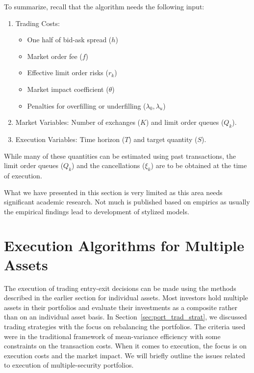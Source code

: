To summarize, recall that the algorithm needs the following input:
	\begin{enumerate}[--]
	\item Trading Costs: 
		\begin{itemize}
		\item One half of bid-ask spread ($h$)
		\item Market order fee ($f$)
		\item Effective limit order risks ($r_k$)
		\item Market impact coefficient ($\theta$)
		\item Penalties for overfilling or underfilling ($\lambda_0,\lambda_u$)
		\end{itemize}
	\item Market Variables: Number of exchanges ($K$) and limit order queues ($Q_k$).
	\item Execution Variables: Time horizon ($T$) and target quantity ($S$).
	\end{enumerate}
While many of these quantities can be estimated using past transactions, the limit order queues ($Q_k$) and the cancellations ($\xi_k$) are to be obtained at the time of execution.


What we have presented in this section is very limited as this area needs significant academic research. Not much is published based on empirics as usually the empirical findings lead to development of stylized models. 


\section{Execution Algorithms for Multiple Assets\label{sec:exec_alg_multasset}} \label{in:mult_mark}

The execution of trading entry-exit decisions can be made using the methods described in the earlier section for individual assets. Most investors hold multiple assets in their portfolios and evaluate their investments as a composite rather than on an individual asset basis. In Section~\ref{sec:port_trad_strat}, we discussed trading strategies with the focus on rebalancing the portfolios. The criteria used were in the traditional framework of mean-variance efficiency with some constraints on the transaction costs. When it comes to execution, the focus is on execution costs and the market impact. We will briefly outline the issues related to execution of multiple-security portfolios.


